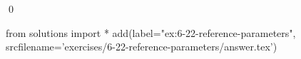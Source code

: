 
\begin{ex}
  \label{ex:6-22-reference-parameters}
  
  \qed
\end{ex}
\begin{python0}
from solutions import *
add(label="ex:6-22-reference-parameters",
    srcfilename='exercises/6-22-reference-parameters/answer.tex')
\end{python0}
